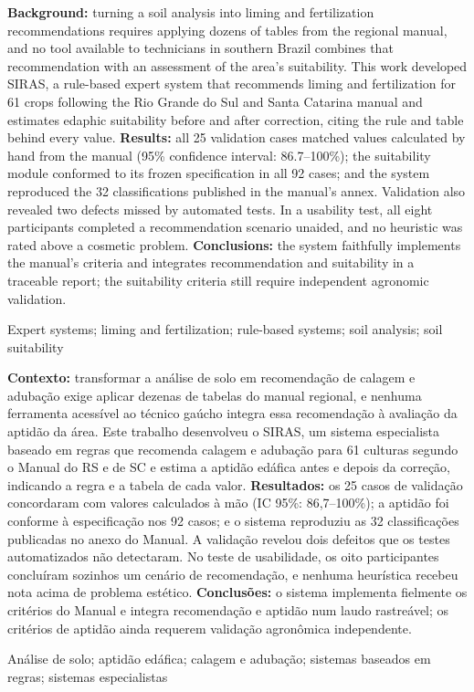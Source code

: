 
\begin{Abstract}
\textbf{Background:} turning a soil analysis into liming and fertilization recommendations
requires applying dozens of tables from the regional manual, and no tool available to technicians
in southern Brazil combines that recommendation with an assessment of the area's suitability. This
work developed SIRAS, a rule-based expert system that recommends liming and fertilization for 61
crops following the Rio Grande do Sul and Santa Catarina manual and estimates edaphic suitability
before and after correction, citing the rule and table behind every value.
\textbf{Results:} all 25 validation cases matched values calculated by hand from the manual (95\%
confidence interval: 86.7--100\%); the suitability module conformed to its frozen specification in
all 92 cases; and the system reproduced the 32 classifications published in the manual's annex.
Validation also revealed two defects missed by automated tests.
In a usability test, all eight participants completed a recommendation scenario unaided, and no
heuristic was rated above a cosmetic problem.
\textbf{Conclusions:} the system faithfully implements the manual's criteria and integrates
recommendation and suitability in a traceable report; the suitability criteria still require
independent agronomic validation.
\end{Abstract}

\begin{keywords}
Expert systems; liming and fertilization; rule-based systems; soil analysis; soil suitability
\end{keywords}

\begin{resumo}
\textbf{Contexto:} transformar a análise de solo em recomendação de calagem e adubação exige
aplicar dezenas de tabelas do manual regional, e nenhuma ferramenta acessível ao técnico gaúcho
integra essa recomendação à avaliação da aptidão da área. Este trabalho desenvolveu o SIRAS, um
sistema especialista baseado em regras que recomenda calagem e adubação para 61 culturas segundo o
Manual do RS e de SC e estima a aptidão edáfica antes e depois da correção, indicando a regra e a
tabela de cada valor.
\textbf{Resultados:} os 25 casos de validação concordaram com valores calculados à mão (IC 95\%:
86,7--100\%); a aptidão foi conforme à especificação nos 92 casos; e o sistema reproduziu as 32
classificações publicadas no anexo do Manual. A validação revelou dois defeitos que os testes automatizados não detectaram.
No teste de usabilidade, os oito participantes concluíram sozinhos um cenário de recomendação, e
nenhuma heurística recebeu nota acima de problema estético.
\textbf{Conclusões:} o sistema implementa fielmente os critérios do Manual e integra recomendação
e aptidão num laudo rastreável; os critérios de aptidão ainda requerem validação agronômica
independente.
\end{resumo}

\begin{palavras_chave}
Análise de solo; aptidão edáfica; calagem e adubação; sistemas baseados em regras; sistemas especialistas
\end{palavras_chave}
